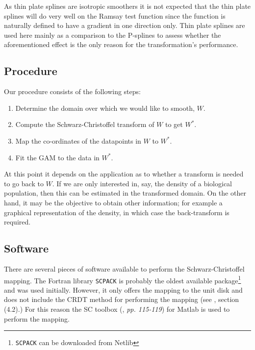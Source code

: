 \documentclass[a4paper,10pt]{amsart}
\newcommand{\sch}{Schwarz-Christoffel }
\begin{document}
As thin plate splines are isotropic smoothers it is not expected that the thin plate splines will do very well on the Ramsay test function since the function is naturally defined to have a gradient in one direction only. Thin plate splines are used here mainly as a comparison to the P-splines to assess whether the aforementioned effect is the only reason for the transformation's performance.

\subsection{Procedure}

Our procedure consists of the following steps:

\begin{enumerate}
\item Determine the domain over which we would like to smooth, $W$.

\item Compute the \sch transform of $W$ to get $W^*$.

\item Map the co-ordinates of the datapoints in $W$ to $W^*$.

\item Fit the GAM to the data in $W^*$.
\end{enumerate}

At this point it depends on the application as to whether a transform is needed to go back to $W$. If we are only interested in, say, the density of a biological population, then this can be estimated in the transformed domain. On the other hand, it may be the objective to obtain other information; for example a graphical representation of the density, in which case the back-transform is required.

\subsection{Software}

There are several pieces of software available to perform the \sch mapping. The Fortran library \texttt{SCPACK} is probably the oldest available package\footnote{\texttt{SCPACK} can be downloaded from Netlib} and was used initially. However, it only offers the mapping to the unit disk and does not include the CRDT method for performing the mapping (see \cite{miller08}, section (4.2).) For this reason the SC toolbox (\cite{driscoll}, \emph{pp. 115-119}) for Matlab is used to perform the mapping. 
\end{document}

